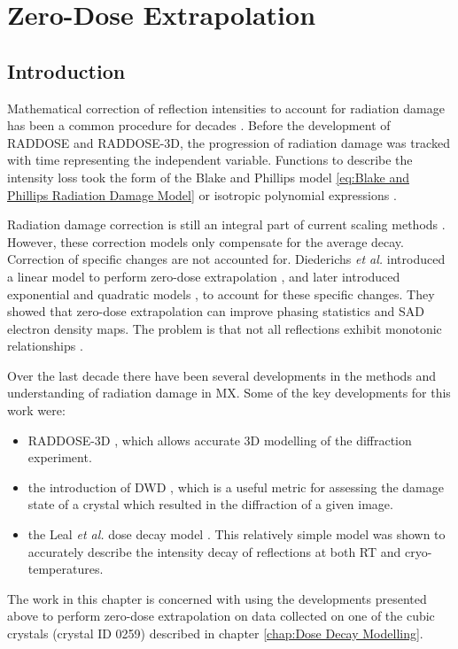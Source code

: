 \chapter{Zero-Dose Extrapolation}
\label{chap:Zero-Dose Extrapolation}

\section{Introduction}
\label{sec:Introduction - Zero-Dose extrapolation}
Mathematical correction of reflection intensities to account for radiation damage has been a common procedure for decades \cite{hendrickson1973,abrahams1987anisotropy}.
Before the development of RADDOSE and RADDOSE-3D, the progression of radiation damage was tracked with time representing the independent variable.
Functions to describe the intensity loss took the form of the Blake and Phillips model \ref{eq:Blake and Phillips Radiation Damage Model} or isotropic polynomial expressions \cite{abrahams1987anisotropy}.

Radiation damage correction is still an integral part of current scaling methods \cite{otwinowski2003multiparametric,evans2005,kabsch2010integration}.
However, these correction models only compensate for the average decay.
Correction of specific changes are not accounted for.
Diederichs \textit{et al.}  introduced a linear model to perform zero-dose extrapolation \cite{diederichs2003}, and later introduced exponential and quadratic models \cite{diederichs2006}, to account for these specific changes.
They showed that zero-dose extrapolation can improve phasing statistics and SAD electron density maps.
The problem is that not all reflections exhibit monotonic relationships \cite{blake1962,abrahams1973}.

Over the last decade there have been several developments in the methods and understanding of radiation damage in MX.
Some of the key developments for this work were:
\begin{itemize}
    \item RADDOSE-3D \cite{zeldin2013}, which allows accurate 3D modelling of the diffraction experiment.
    \item the introduction of DWD \cite{zeldin2013dwd}, which is a useful metric for assessing the damage state of a crystal which resulted in the diffraction of a given image.
    \item the Leal \textit{et al.} dose decay model \cite{leal2012}. This relatively simple model was shown to accurately describe the intensity decay of reflections at both RT and cryo-temperatures.
\end{itemize}
The work in this chapter is concerned with using the developments presented above to perform zero-dose extrapolation on data collected on one of the cubic crystals (crystal ID 0259) described in chapter \ref{chap:Dose Decay Modelling}.
